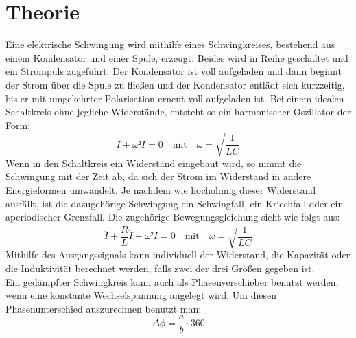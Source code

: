 \section{Theorie}
\label{sec:Theorie}

Eine elektrische Schwingung wird mithilfe eines Schwingkreises, bestehend aus einem Kondensator und einer Spule, erzeugt.
Beides wird in Reihe geschaltet und ein Strompuls zugeführt.
Der Kondensator ist voll aufgeladen und dann beginnt der Strom über die Spule zu fließen und der Kondensator entlädt sich kurzzeitig, bis er mit umgekehrter Polarisation erneut voll aufgeladen ist.
Bei einem idealen Schaltkreis ohne jegliche Widerstände, entsteht so ein harmonischer Oszillator der Form:
\begin{equation}
    \ddot{I} + \omega² I = 0 \quad\textrm{mit}\quad \omega = \sqrt{\frac{1}{LC}}
    \label{eq:harmossi}
\end{equation}
Wenn in den Schaltkreis ein Widerstand eingebaut wird, so nimmt die Schwingung mit der Zeit ab, da sich der Strom im Widerstand in andere Energieformen umwandelt.
Je nachdem wie hochohmig dieser Widerstand ausfällt, ist die dazugehörige Schwingung ein Schwingfall, ein Kriechfall oder ein aperiodischer Grenzfall.
Die zugehörige Bewegungsgleichung sieht wie folgt aus:
\begin{equation}
    \ddot{I} + \frac{R}{L}\dot{I} + \omega² I = 0 \quad\textrm{mit}\quad \omega = \sqrt{\frac{1}{LC}}
    \label{eq:dampfossi}
\end{equation}
Mithilfe des Ausgangssignals kann individuell der Widerstand, die Kapazität oder die Induktivität berechnet werden, falls zwei der drei Größen gegeben ist.
\\
Ein gedämpfter Schwingkreis kann auch als Phasenverschieber benutzt werden, wenn eine konstante Wechselspannung angelegt wird.
Um diesen Phasenunterschied auszurechnen benutzt man:
\begin{equation}
    \Delta\phi = \frac{a}{b}\cdot360
    \label{eq:phase}
\end{equation}
